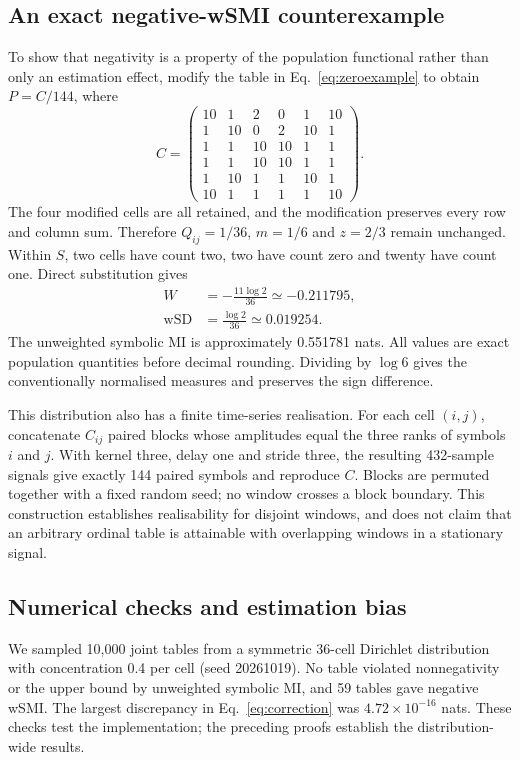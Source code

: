 \subsection{An exact negative-wSMI counterexample}
To show that negativity is a property of the population functional rather than only an estimation effect, modify the table in Eq.~\eqref{eq:zeroexample} to obtain $P=C/144$, where
\begin{equation}
C=\begin{pmatrix}
10&1&2&0&1&10\\
1&10&0&2&10&1\\
1&1&10&10&1&1\\
1&1&10&10&1&1\\
1&10&1&1&10&1\\
10&1&1&1&1&10
\end{pmatrix}.
\label{eq:counterexample}
\end{equation}
The four modified cells are all retained, and the modification preserves every row and column sum. Therefore $Q_{ij}=1/36$, $m=1/6$ and $z=2/3$ remain unchanged. Within $S$, two cells have count two, two have count zero and twenty have count one. Direct substitution gives
\begin{align}
W&=-\frac{11\log2}{36}\simeq-0.211795,\\
\operatorname{wSD}&=\frac{\log2}{36}\simeq0.019254.
\end{align}
The unweighted symbolic MI is approximately 0.551781 nats. All values are exact population quantities before decimal rounding. Dividing by $\log6$ gives the conventionally normalised measures and preserves the sign difference.

This distribution also has a finite time-series realisation. For each cell $(i,j)$, concatenate $C_{ij}$ paired blocks whose amplitudes equal the three ranks of symbols $i$ and $j$. With kernel three, delay one and stride three, the resulting 432-sample signals give exactly 144 paired symbols and reproduce $C$. Blocks are permuted together with a fixed random seed; no window crosses a block boundary. This construction establishes realisability for disjoint windows, and does not claim that an arbitrary ordinal table is attainable with overlapping windows in a stationary signal.

\subsection{Numerical checks and estimation bias}
We sampled 10,000 joint tables from a symmetric 36-cell Dirichlet distribution with concentration 0.4 per cell (seed 20261019). No table violated nonnegativity or the upper bound by unweighted symbolic MI, and 59 tables gave negative wSMI. The largest discrepancy in Eq.~\eqref{eq:correction} was $4.72\times10^{-16}$ nats. These checks test the implementation; the preceding proofs establish the distribution-wide results.

